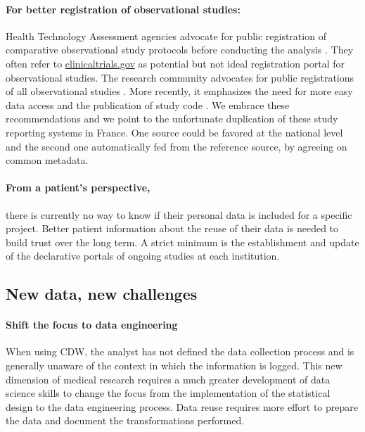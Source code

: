 \documentclass[french,12pt,twoside,a4paper]{book}
\begin{document}
\paragraph{For better registration of observational studies:} Health Technology
Assessment agencies advocate for public registration of comparative
observational study protocols before conducting the analysis
\citep{berger2017good,fda_real-world_2021,has_real-world_2021}. They often refer
to \url{clinicaltrials.gov} as potential but not ideal registration portal for
observational studies. The research community advocates for public registrations
of all observational studies \citep{rushton2011should,plos2014observational}.
More recently, it emphasizes the need for more easy data access and the
publication of study code
\citep{pavlenko_implementation_2020,kohane_what_2021,nih_2023}. We embrace these
recommendations and we point to the unfortunate duplication of these study
reporting systems in France. One source could be favored at the national level
and the second one automatically fed from the reference source, by agreeing on
common metadata.

\paragraph{From a patient's perspective,} there is currently no way to know if
their personal data is included for a specific project. Better patient
information about the reuse of their data is needed to build trust over the long
term. A strict minimum is the establishment and update of the declarative
portals of ongoing studies at each institution.

\subsection{New data, new challenges}%
\label{subsec:cdw:recommendations:data}%

\paragraph{Shift the focus to data engineering} When using CDW, the analyst has not defined the data collection process and is
generally unaware of the context in which the information is logged. This new
dimension of medical research requires a much greater development of data
science skills to change the focus from the implementation of the statistical
design to the data engineering process. Data reuse requires more effort to
prepare the data and document the transformations performed.
\end{document}
